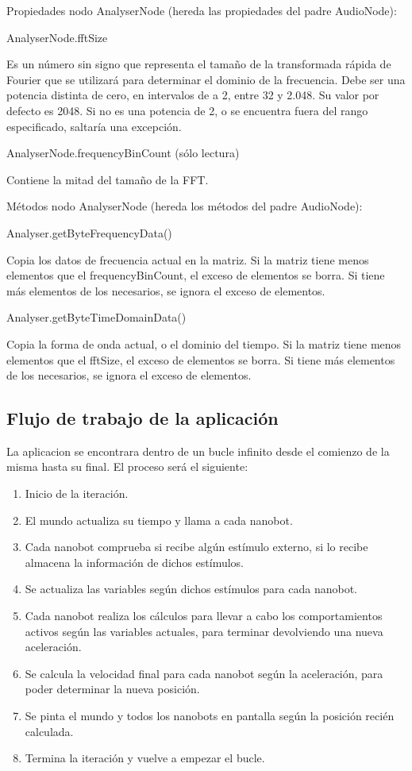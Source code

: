 Propiedades nodo AnalyserNode (hereda las propiedades del padre AudioNode): 

AnalyserNode.fftSize

Es un número sin signo que representa el tamaño de la transformada rápida de Fourier que se utilizará para determinar el dominio de la frecuencia. Debe ser una potencia distinta de cero,  en intervalos de a  2,  entre 32 y 2.048.  Su valor por defecto es 2048. Si no es una potencia de 2, o se encuentra fuera del rango especificado, saltaría una excepción.

AnalyserNode.frequencyBinCount (sólo lectura)

Contiene la mitad del tamaño de la FFT.

Métodos nodo AnalyserNode (hereda los métodos del padre AudioNode):

Analyser.getByteFrequencyData()

Copia los datos de frecuencia actual en la matriz. Si la matriz tiene menos elementos que el frequencyBinCount, el exceso de elementos se borra. Si tiene más elementos de los necesarios, se ignora el exceso de elementos.

Analyser.getByteTimeDomainData()

Copia la forma de onda actual, o el dominio del tiempo. Si la matriz tiene menos elementos que el fftSize, el exceso de elementos se borra. Si tiene más elementos de los necesarios, se ignora el exceso de elementos.



\subsection{Flujo de trabajo de la aplicación}
\label{sec:flujo}
La aplicacion se encontrara dentro de un bucle infinito desde el comienzo de la misma hasta su final. El proceso será el siguiente:
\begin{enumerate}
 \item Inicio de la iteración.
 \item El mundo actualiza su tiempo y llama a cada nanobot.
 \item Cada nanobot comprueba si recibe algún estímulo externo, si lo recibe almacena la información de dichos estímulos.
 \item Se actualiza las variables según dichos estímulos para cada nanobot.
 \item Cada nanobot realiza los cálculos para llevar a cabo los comportamientos activos según las variables actuales, para terminar devolviendo una nueva aceleración.
 \item Se calcula la velocidad final para cada nanobot según la aceleración, para poder determinar la nueva posición.
 \item Se pinta el mundo y todos los nanobots en pantalla según la posición recién calculada.
 \item Termina la iteración y vuelve a empezar el bucle.
\end{enumerate}

 





